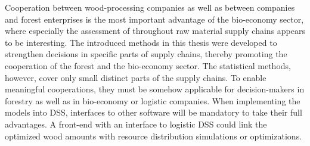 Cooperation between wood-processing companies as well as between companies and forest enterprises is the most important advantage of the bio-economy sector, where especially the assessment of throughout raw material supply chains appears to be interesting. The introduced methods in this thesis were developed to strengthen decisions in specific parts of supply chains, thereby promoting the cooperation of the forest and the bio-economy sector. The statistical methods, however, cover only small distinct parts of the supply chains. To enable meaningful cooperations, they must be somehow applicable for decision-makers in forestry as well as in bio-economy or logistic companies. When implementing the models into DSS, interfaces to other software will be mandatory to take their full advantages. A front-end with an interface to logistic DSS could link the optimized wood amounts with resource distribution simulations or optimizations.